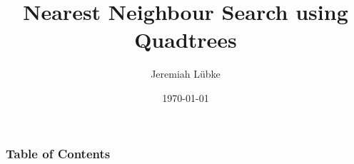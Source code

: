 \documentclass[mathserif]{beamer}
\title{Nearest Neighbour Search using Quadtrees}
\author{Jeremiah Lübke}
\date{\today}
\begin{document}
\frame{\titlepage}

\begin{frame}
    \frametitle{Table of Contents}
    \tableofcontents
\end{frame}







\setcounter{equation}{0}



\end{document}
